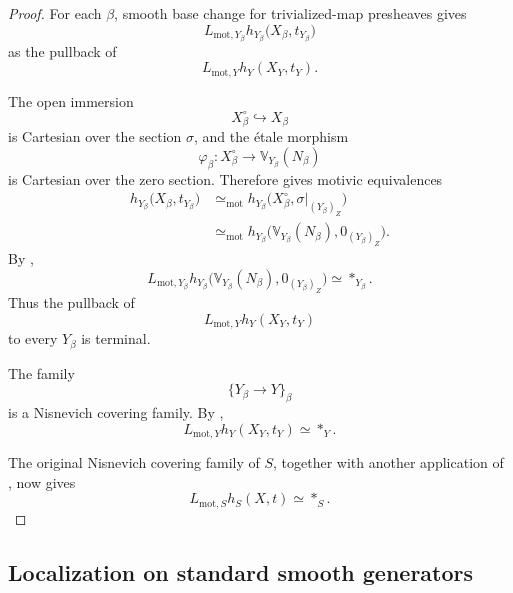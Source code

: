 \begin{proof}
For each \(\beta\), smooth base change for trivialized-map presheaves
gives
\[
    L_{\mathrm{mot},Y_\beta}
    h_{Y_\beta}
    \bigl(
        X_\beta,
        t_{Y_\beta}
    \bigr)
\]
as the pullback of
\[
    L_{\mathrm{mot},Y}
    h_Y(X_Y,t_Y).
\]

The open immersion
\[
    X_\beta^\circ
    \hookrightarrow
    X_\beta
\]
is Cartesian over the section \(\sigma\), and the étale morphism
\[
    \varphi_\beta
    \colon
    X_\beta^\circ
    \longrightarrow
    \mathbb V_{Y_\beta}(N_\beta)
\]
is Cartesian over the zero section.  Therefore
gives motivic equivalences
\[
\begin{aligned}
    h_{Y_\beta}
    \bigl(
        X_\beta,
        t_{Y_\beta}
    \bigr)
    &\simeq_{\mathrm{mot}}
    h_{Y_\beta}
    \bigl(
        X_\beta^\circ,
        \sigma|_{(Y_\beta)_Z}
    \bigr)
    \\
    &\simeq_{\mathrm{mot}}
    h_{Y_\beta}
    \bigl(
        \mathbb V_{Y_\beta}(N_\beta),
        0_{(Y_\beta)_Z}
    \bigr).
\end{aligned}
\]
By
,
\[
    L_{\mathrm{mot},Y_\beta}
    h_{Y_\beta}
    \bigl(
        \mathbb V_{Y_\beta}(N_\beta),
        0_{(Y_\beta)_Z}
    \bigr)
    \simeq
    *_{Y_\beta}.
\]
Thus the pullback of
\[
    L_{\mathrm{mot},Y}h_Y(X_Y,t_Y)
\]
to every \(Y_\beta\) is terminal.

The family
\[
    \{Y_\beta\to Y\}_\beta
\]
is a Nisnevich covering family.  By
,
\[
    L_{\mathrm{mot},Y}h_Y(X_Y,t_Y)
    \simeq
    *_Y.
\]

The original Nisnevich covering family of \(S\), together with another
application of
,
now gives
\[
    L_{\mathrm{mot},S}h_S(X,t)
    \simeq
    *_S.
\]
\end{proof}

\subsection{Localization on standard smooth generators}

